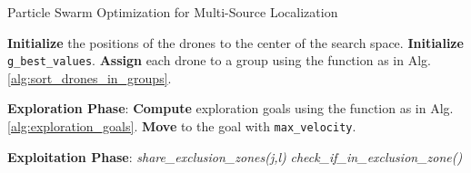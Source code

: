 \begin{algorithm}
    \caption{Particle Swarm Optimization for Multi-Source Localization}\label{alg:PSO}
    \begin{algorithmic}[1]
        \State \textbf{Initialize} the positions of the drones to the center of the search space.
        \State \textbf{Initialize} \texttt{g\_best\_values}.
        \State \textbf{Assign} each drone to a group using the function as in Alg.\eqref{alg:sort_drones_in_groups}.
        
        \State 
        \State \textbf{Exploration Phase}:
        \State \textbf{Compute} exploration goals using the function as in Alg.\eqref{alg:exploration_goals}.
            \State \textbf{Move} to the goal with \texttt{max\_velocity}.
        \EndFor
        
        \State 
        \State \textbf{Exploitation Phase}:
                        \State \textit{share\_exclusion\_zones(j,l)}
                    \EndIf
                \EndFor
                \State \textit{check\_if\_in\_exclusion\_zone()} 
                

\end{algorithmic}
\end{algorithm}

